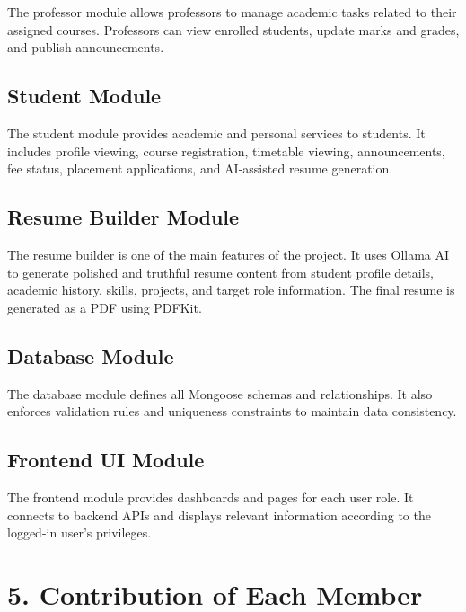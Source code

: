 \documentclass[12pt]{article}
\begin{document}
The professor module allows professors to manage academic tasks related to their assigned courses. Professors can view enrolled students, update marks and grades, and publish announcements.

\subsection*{Student Module}

The student module provides academic and personal services to students. It includes profile viewing, course registration, timetable viewing, announcements, fee status, placement applications, and AI-assisted resume generation.

\subsection*{Resume Builder Module}

The resume builder is one of the main features of the project. It uses Ollama AI to generate polished and truthful resume content from student profile details, academic history, skills, projects, and target role information. The final resume is generated as a PDF using PDFKit.

\subsection*{Database Module}

The database module defines all Mongoose schemas and relationships. It also enforces validation rules and uniqueness constraints to maintain data consistency.

\subsection*{Frontend UI Module}

The frontend module provides dashboards and pages for each user role. It connects to backend APIs and displays relevant information according to the logged-in user's privileges.

\vspace{1em}     %

\section*{5. Contribution of Each Member}
\end{document}
